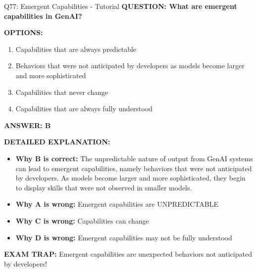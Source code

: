 \documentclass[8pt]{beamer}
\begin{document}
	\begin{frame}{Q77: Emergent Capabilities - Tutorial}
		\fontsize{6.5}{7.5}\selectfont
		\textbf{QUESTION: What are emergent capabilities in GenAI?}
		
		\vspace{0.1cm}
		\textbf{OPTIONS:}
		\begin{enumerate}
			\item Capabilities that are always predictable
			\item Behaviors that were not anticipated by developers as models become larger and more sophisticated
			\item Capabilities that never change
			\item Capabilities that are always fully understood
		\end{enumerate}
		
		\vspace{0.1cm}
		\textcolor{myblue}{\textbf{ANSWER: B}}
		
		\vspace{0.1cm}
		\textbf{DETAILED EXPLANATION:}
		\begin{itemize}
			\item \textbf{Why B is correct:} The unpredictable nature of output from GenAI systems can lead to emergent capabilities, namely behaviors that were not anticipated by developers. As models become larger and more sophisticated, they begin to display skills that were not observed in smaller models.
			\item \textbf{Why A is wrong:} Emergent capabilities are UNPREDICTABLE
			\item \textbf{Why C is wrong:} Capabilities can change
			\item \textbf{Why D is wrong:} Emergent capabilities may not be fully understood
		\end{itemize}
		
		\textcolor{myred}{\textbf{EXAM TRAP:}} Emergent capabilities are \textcolor{myblue}{unexpected behaviors not anticipated by developers}!
	\end{frame}
	
\end{document}
